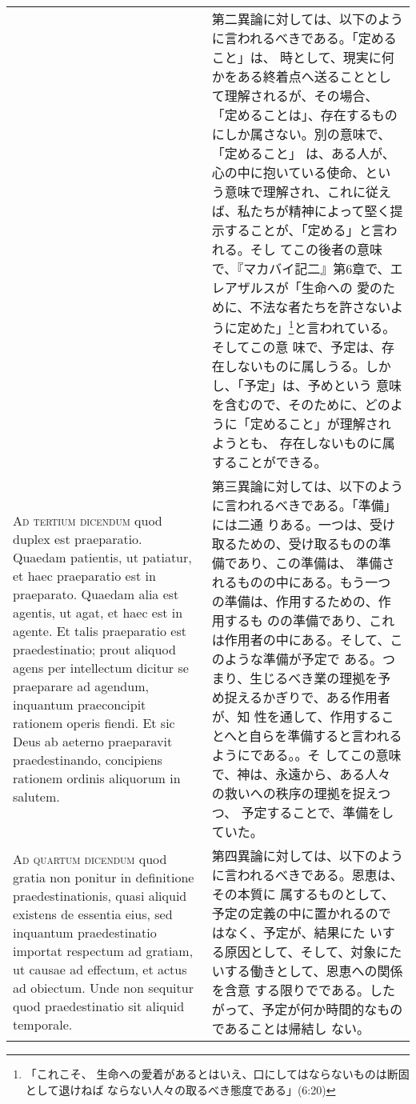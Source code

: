 \documentclass[10pt]{jsarticle} %
\begin{document}
\begin{longtable}{p{21em}p{21em}}
&

第二異論に対しては、以下のように言われるべきである。「定めること」は、
時として、現実に何かをある終着点へ送ることとして理解されるが、その場合、
「定めることは」、存在するものにしか属さない。別の意味で、「定めること」
は、ある人が、心の中に抱いている使命、という意味で理解され、これに従え
ば、私たちが精神によって堅く提示することが、「定める」と言われる。そし
てこの後者の意味で、『マカバイ記二』第6章で、エレアザルスが「生命への
愛のために、不法な者たちを許さないように定めた」\footnote{「これこそ、
生命への愛着があるとはいえ、口にしてはならないものは断固として退けねば
ならない人々の取るべき態度である」(6:20)}と言われている。そしてこの意
味で、予定は、存在しないものに属しうる。しかし、「予定」は、予めという
意味を含むので、そのために、どのように「定めること」が理解されようとも、
存在しないものに属することができる。
 

\\


{\scshape Ad tertium dicendum} quod duplex est
praeparatio. Quaedam patientis, ut patiatur, et haec praeparatio est in
praeparato. Quaedam alia est agentis, ut agat, et haec est in agente. Et
talis praeparatio est praedestinatio; prout aliquod agens per
intellectum dicitur se praeparare ad agendum, inquantum praeconcipit
rationem operis fiendi. Et sic Deus ab aeterno praeparavit
praedestinando, concipiens rationem ordinis aliquorum in salutem.


&

 第三異論に対しては、以下のように言われるべきである。「準備」には二通
りある。一つは、受け取るための、受け取るものの準備であり、この準備は、
準備されるものの中にある。もう一つの準備は、作用するための、作用するも
のの準備であり、これは作用者の中にある。そして、このような準備が予定で
ある。つまり、生じるべき業の理拠を予め捉えるかぎりで、ある作用者が、知
性を通して、作用することへと自らを準備すると言われるようにである。。そ
してこの意味で、神は、永遠から、ある人々の救いへの秩序の理拠を捉えつつ、
予定することで、準備をしていた。
 

\\


{\scshape Ad quartum dicendum} quod gratia non ponitur
in definitione praedestinationis, quasi aliquid existens de essentia
eius, sed inquantum praedestinatio importat respectum ad gratiam, ut
causae ad effectum, et actus ad obiectum. Unde non sequitur quod
praedestinatio sit aliquid temporale.


&

第四異論に対しては、以下のように言われるべきである。恩恵は、その本質に
属するものとして、予定の定義の中に置かれるのではなく、予定が、結果にた
いする原因として、そして、対象にたいする働きとして、恩恵への関係を含意
する限りでである。したがって、予定が何か時間的なものであることは帰結し
ない。


\end{longtable}
\newpage
\end{document}
